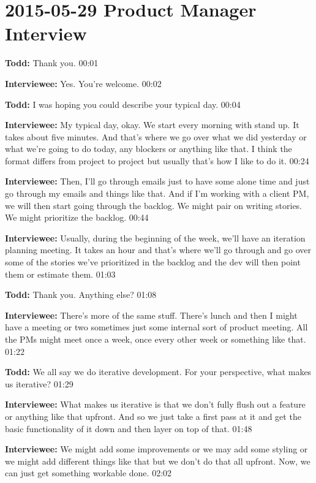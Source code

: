 \section{2015-05-29 Product Manager Interview}

\textbf{Todd:} Thank you. 00:01

\textbf{Interviewee:} Yes. You're welcome. 00:02

\textbf{Todd:} I was hoping you could describe your typical day. 00:04

\textbf{Interviewee:} My typical day, okay. We start every morning with stand up. It takes about five minutes. And that's where we go over what we did yesterday or what we're going to do today, any blockers or anything like that. I think the format differs from project to project but usually that's how I like to do it. 00:24

\textbf{Interviewee:} Then, I'll go through emails just to have some alone time and just go through my emails and things like that. And if I'm working with a client PM, we will then start going through the backlog. We might pair on writing stories. We might prioritize the backlog. 00:44

\textbf{Interviewee:} Usually, during the beginning of the week, we'll have an iteration planning meeting. It takes an hour and that's where we'll go through and go over some of the stories we've prioritized in the backlog and the dev will then point them or estimate them. 01:03

\textbf{Todd:} Thank you. Anything else? 01:08

\textbf{Interviewee:} There's more of the same stuff. There's lunch and then I might have a meeting or two sometimes just some internal sort of product meeting. All the PMs might meet once a week, once every other week or something like that. 01:22

\textbf{Todd:} We all say we do iterative development. For your perspective, what makes us iterative? 01:29

\textbf{Interviewee:} What makes us iterative is that we don't fully flush out a feature or anything like that upfront. And so we just take a first pass at it and get the basic functionality of it down and then layer on  top of that. 01:48

\textbf{Interviewee:} We might add some improvements or we may add some styling or we might add different things like that but we don't do that all upfront. Now, we can just get something workable  done. 02:02

